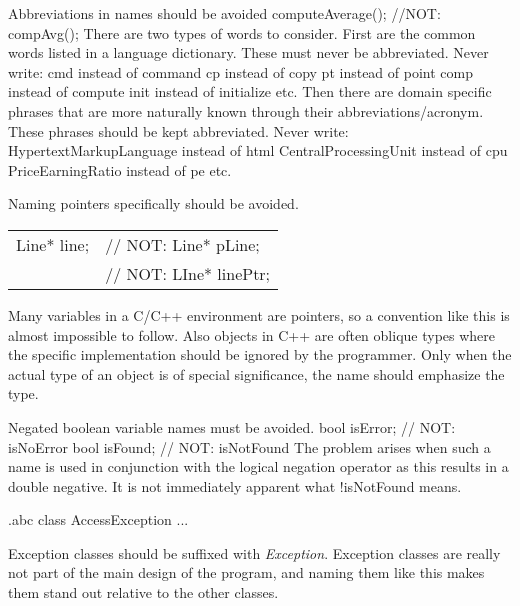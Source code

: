 \recommendation
{Abbreviations in names should be avoided}
{computeAverage(); //NOT: compAvg();}
{
	There are two types of words to consider. First are the common words listed in a language dictionary. These must never be abbreviated. Never write:\newline
	cmd   instead of   command\newline
	cp    instead of   copy\newline
	pt    instead of   point\newline
	comp  instead of   compute\newline
	init  instead of   initialize\newline
	etc.\newline
	Then there are domain specific phrases that are more naturally known through their abbreviations/acronym. These phrases should be kept abbreviated. Never write:\newline
	HypertextMarkupLanguage  instead of   html\newline
	CentralProcessingUnit    instead of   cpu\newline
	PriceEarningRatio        instead of   pe\newline
	etc.
}

\recommendation
{Naming pointers specifically should be avoided.}
{
	\begin{tabularx}{\textwidth}{ll}
		Line* line;&// NOT: Line* pLine;\\
		&// NOT: LIne* linePtr;
	\end{tabularx}
}
{Many variables in a C/C++ environment are pointers, so a convention like this is almost impossible to follow. Also objects in C++ are often oblique types where the specific implementation should be ignored by the programmer. Only when the actual type of an object is of special significance, the name should emphasize the type.}

\recommendation
{Negated boolean variable names must be avoided.}
{
	bool isError; // NOT: isNoError\newline
	bool isFound; // NOT: isNotFound
}
{The problem arises when such a name is used in conjunction with the logical negation operator as this results in a double negative. It is not immediately apparent what !isNotFound means.}

\begin{filecontents*}{\jobname.abc}
	class AccessException
	{
		...
	}
\end{filecontents*}

\recommendation
{Exception classes should be suffixed with \textit{Exception}.}
{}
{Exception classes are really not part of the main design of the program, and naming them like this makes them stand out relative to the other classes.}

